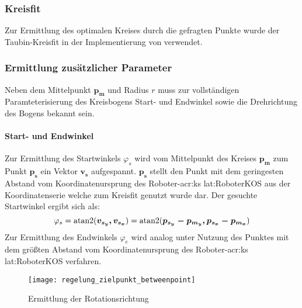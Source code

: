 \subsubsection{Kreisfit} 
Zur Ermittlung des optimalen Kreises durch die gefragten Punkte wurde der Taubin-Kreisfit \autocite{taubinEstimationPlanarCurves1991} in der Implementierung von \autocite{nikolaichernovMATLABCodesFitting} verwendet. 

\subsubsection{Ermittlung zusätzlicher Parameter}
Neben dem Mittelpunkt \(\boldsymbol{p_m}\) und Radius \(r\) muss zur vollständigen Paramteterisierung des Kreisbogens Start- und Endwinkel sowie die Drehrichtung des Bogens bekannt sein.

\paragraph{Start- und Endwinkel}
Zur Ermittlung des Startwinkels \( \varphi_s \) wird vom Mittelpunkt des Kreises \(\boldsymbol{p_m}\) zum Punkt  \(\boldsymbol{p_s}\) ein Vektor \(\boldsymbol{v_s}\) aufgespannt.  \(\boldsymbol{p_s}\) stellt den Punkt mit dem geringesten Abstand vom Koordinatenursprung des Roboter-\gls{acr:ks} \gls{lat:RoboterKOS} aus der Koordinatenserie welche zum Kreisfit genutzt wurde dar.  Der gesuchte Startwinkel ergibt sich als:
\begin{equation}
\varphi_s =
\operatorname{atan2} (\boldsymbol{v_{s_y}, v_{s_x}}) = 
\operatorname{atan2} (\boldsymbol{p_{s_y}-p_{m_y}, p_{s_x}-p_{m_x}})
\end{equation}
Zur Ermittlung des Endwinkels \( \varphi_e \) wird analog unter Nutzung des Punktes mit dem größten Abstand vom Koordinatenursprung des Roboter-\gls{acr:ks} \gls{lat:RoboterKOS} verfahren.

\begin{figure}[htb]
  \centering
  \texttt{[image: regelung\_zielpunkt\_betweenpoint]}
  \caption{Ermittlung der Rotationsrichtung}
  \label{fig:regelung:zielpunkt:betweenpoint}
\end{figure}

